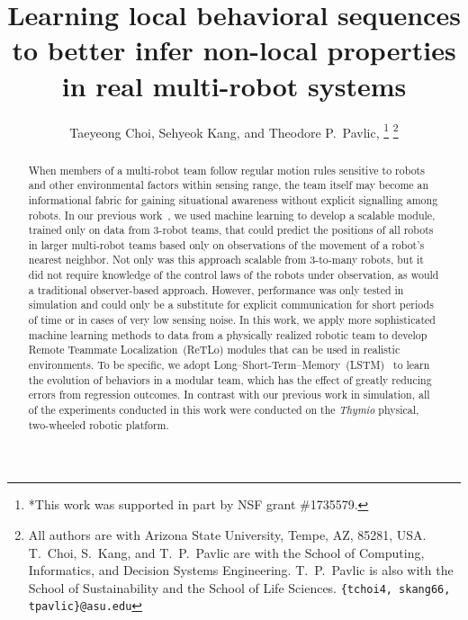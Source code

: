 \documentclass[letterpaper, 10 pt, conference]{ieeeconf}  %
\title{\LARGE \bf
	Learning local behavioral sequences
	to better infer non-local properties in real multi-robot systems
}
\author{Taeyeong Choi, Sehyeok Kang, and Theodore P.~Pavlic, \IEEEmembership{Member, IEEE} %
    \thanks{*This work was supported in part by NSF grant \#1735579.}%
    \thanks{All authors are with Arizona State University, Tempe, AZ,
        85281, USA. T.~Choi, S.~Kang, and T.~P.~Pavlic are with the
        School of Computing, Informatics, and Decision Systems
        Engineering. T.~P.~Pavlic is also with the School of
        Sustainability and the School of Life Sciences.
        {\tt\small \{tchoi4, skang66, tpavlic\}@asu.edu}}%
}
\begin{document}
	\maketitle
	\thispagestyle{empty}
	\pagestyle{empty}


	\begin{abstract}
        When members of a multi-robot team follow regular motion
        rules sensitive to robots and other environmental factors
        within sensing range, the team itself may become an
        informational fabric for gaining situational awareness without
        explicit signalling among robots. In our previous
        work~\cite{CPR17}, we used machine learning
        to develop a scalable module, trained only on data from
        3-robot teams, that could predict the positions of all
        robots in larger multi-robot teams based only on observations of the
        movement of a robot's nearest neighbor. Not only was this
        approach scalable from 3-to-many robots, but it did not require
        knowledge of the control laws of the robots under observation,
        as would a traditional observer-based approach.
        However, performance was only tested in
        simulation and could only be a substitute for explicit
        communication for short periods of time or in cases of very low
        sensing noise. In this work, we apply more sophisticated machine
        learning methods to data from a physically realized robotic team to
        develop Remote Teammate Localization~(ReTLo) modules that can be
        used in realistic environments. To be specific, we adopt
        Long--Short-Term--Memory~(LSTM)~\cite{HS97} to learn the
        evolution of behaviors in a modular team, which has the effect
        of greatly reducing errors from regression outcomes. In contrast
        with our previous work in simulation, all of the experiments
        conducted in this work were conducted on the \emph{Thymio}
        physical, two-wheeled robotic platform.

\end{abstract}
\end{document}
